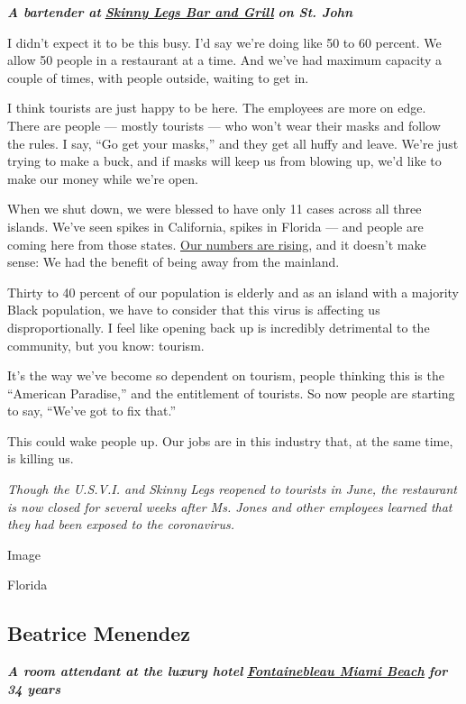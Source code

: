 \emph{\textbf{A bartender at}}
\textbf{\href{http://www.skinnylegsvi.com/}{\emph{Skinny Legs Bar and
Grill}}} \emph{\textbf{on St. John}}

I didn't expect it to be this busy. I'd say we're doing like 50 to 60
percent. We allow 50 people in a restaurant at a time. And we've had
maximum capacity a couple of times, with people outside, waiting to get
in.

I think tourists are just happy to be here. The employees are more on
edge. There are people --- mostly tourists --- who won't wear their
masks and follow the rules. I say, ``Go get your masks,'' and they get
all huffy and leave. We're just trying to make a buck, and if masks will
keep us from blowing up, we'd like to make our money while we're open.

When we shut down, we were blessed to have only 11 cases across all
three islands. We've seen spikes in California, spikes in Florida ---
and people are coming here from those states.
\href{https://www.covid19usvi.com/}{Our numbers are rising}, and it
doesn't make sense: We had the benefit of being away from the mainland.

Thirty to 40 percent of our population is elderly and as an island with
a majority Black population, we have to consider that this virus is
affecting us disproportionally. I feel like opening back up is
incredibly detrimental to the community, but you know: tourism.

It's the way we've become so dependent on tourism, people thinking this
is the ``American Paradise,'' and the entitlement of tourists. So now
people are starting to say, ``We've got to fix that.''

This could wake people up. Our jobs are in this industry that, at the
same time, is killing us.

\emph{Though the U.S.V.I. and Skinny Legs reopened to tourists in June,
the restaurant is now closed for several weeks after Ms. Jones and other
employees learned that they had been exposed to the coronavirus.}

Image

Florida

\hypertarget{beatrice-menendez}{%
\subsection{Beatrice Menendez}\label{beatrice-menendez}}

\emph{\textbf{A room attendant at the luxury hotel}}
\textbf{\href{https://www.fontainebleau.com/}{\emph{Fontainebleau Miami
Beach}}} \emph{\textbf{for 34 years}}

